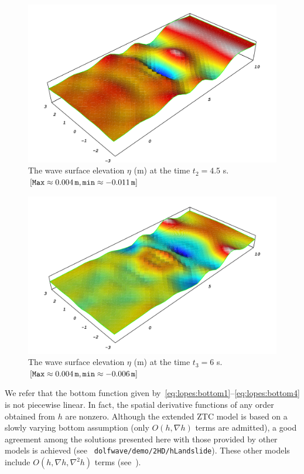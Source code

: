 \begin{figure}
\begin{center}
\includegraphics[width=\largefig]{chapters/lopes/pdf/eta45.pdf}
\caption{The wave surface elevation $\eta$ (m)
   at the time  $t_2=4.5$ s. $[{\tt Max}\approx 0.004\, {\tt m},
    {\tt min}\approx-0.011\, {\tt m}]$}
\label{fig:lopes:objectsurface2}
\end{center}
\end{figure}
\begin{figure}
\begin{center}
\includegraphics[width=\largefig]{chapters/lopes/pdf/eta6.pdf}
\caption{The  wave surface elevation $\eta$ (m)
   at the time  $t_3=6$ s. $[{\tt Max}\approx 0.004\, {\tt m},
    {\tt min}\approx -0.006\,{\tt m}]$}
\label{fig:lopes:objectsurface3}
\end{center}
\end{figure}

We refer that the bottom function given
by~\eqref{eq:lopes:bottom1}--\eqref{eq:lopes:bottom4} is not
piecewise linear. In fact, the spatial derivative functions
of any order obtained from $h$ are nonzero. Although the
extended ZTC model is based on a slowly varying bottom
assumption (only $O(h,\nabla h)$ terms are admitted), a good
agreement among the solutions presented here with those
provided by other models is achieved (see {\tt
  dolfwave/demo/2HD/hLandslide}).  These other
models include $O(h,\nabla h,\nabla^2 h)$ terms
(see~\cite{LopesPereiraTrabucho}).

